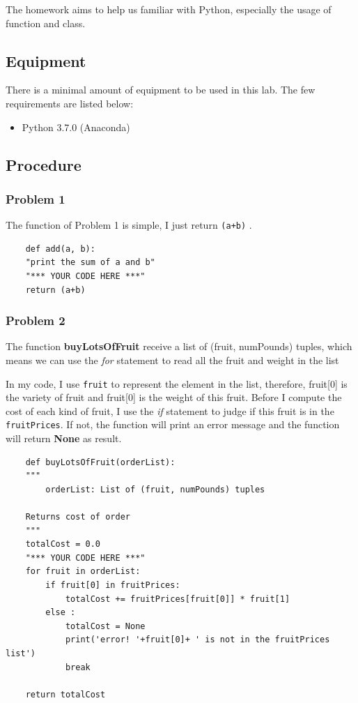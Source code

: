 \documentclass[aps,letterpaper,10pt]{revtex4}
\begin{document}
\vspace{3mm} %

The homework aims to help us familiar with Python, especially the usage of function and class.

\subsection{Equipment}
There is a minimal amount of equipment to be used in this lab.  The few requirements are listed below:
	\begin{itemize}
		\item Python 3.7.0 (Anaconda)
	\end{itemize}

\subsection{Procedure}
\subsubsection{Problem 1}
The function of Problem 1 is simple, I just return \texttt{(a+b)} .
\begin{lstlisting}
	def add(a, b):
    "print the sum of a and b"
    "*** YOUR CODE HERE ***"
    return (a+b)
\end{lstlisting}

\subsubsection{Problem 2}
The function \textbf{buyLotsOfFruit} receive a list of (fruit, numPounds) tuples, which means we can use the \emph{for} statement
to read all the fruit and weight in the list

In my code, I use \texttt{fruit} to represent the element in the list, therefore, fruit[0] is the variety of fruit and fruit[0] is the weight of this fruit.
Before I compute the cost of each kind of fruit, I use the \emph{if} statement to judge if this fruit is in the \texttt{fruitPrices}. If not, the function will print an error message and the function will return \textbf{None} as result.


\begin{lstlisting}
	def buyLotsOfFruit(orderList):
    """
        orderList: List of (fruit, numPounds) tuples

    Returns cost of order
    """
    totalCost = 0.0
    "*** YOUR CODE HERE ***"
    for fruit in orderList:
        if fruit[0] in fruitPrices:
            totalCost += fruitPrices[fruit[0]] * fruit[1]
        else :
            totalCost = None
            print('error! '+fruit[0]+ ' is not in the fruitPrices list')
            break

    return totalCost
\end{lstlisting}
\end{document}
